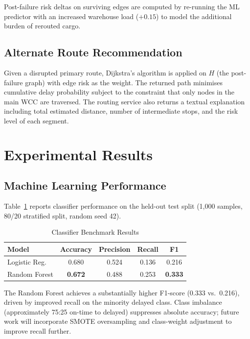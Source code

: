 \documentclass[conference]{IEEEtran}
\begin{document}
Post-failure risk deltas on surviving edges are computed by
re-running the ML predictor with an increased warehouse load
($+0.15$) to model the additional burden of rerouted cargo.

\subsection{Alternate Route Recommendation}

Given a disrupted primary route, Dijkstra's algorithm is applied
on $H$ (the post-failure graph) with edge risk as the weight.
The returned path minimises cumulative delay probability subject
to the constraint that only nodes in the main WCC are traversed.
The routing service also returns a textual explanation including
total estimated distance, number of intermediate stops, and the
risk level of each segment.


\section{Experimental Results}

\subsection{Machine Learning Performance}

Table~\ref{tab:ml} reports classifier performance on the held-out
test split (1,000 samples, 80/20 stratified split, random seed 42).

\begin{table}[h!]
\centering
\caption{Classifier Benchmark Results}
\label{tab:ml}
\begin{tabular}{lcccc}
\toprule
\textbf{Model} & \textbf{Accuracy} & \textbf{Precision} & \textbf{Recall} & \textbf{F1} \\
\midrule
Logistic Reg. & 0.680 & 0.524 & 0.136 & 0.216 \\
Random Forest & \textbf{0.672} & 0.488 & 0.253 & \textbf{0.333} \\
\bottomrule
\end{tabular}
\end{table}

The Random Forest achieves a substantially higher F1-score (0.333
vs.\ 0.216), driven by improved recall on the minority delayed class.
Class imbalance (approximately 75:25 on-time to delayed) suppresses
absolute accuracy; future work will incorporate SMOTE oversampling
and class-weight adjustment to improve recall further.
\end{document}
